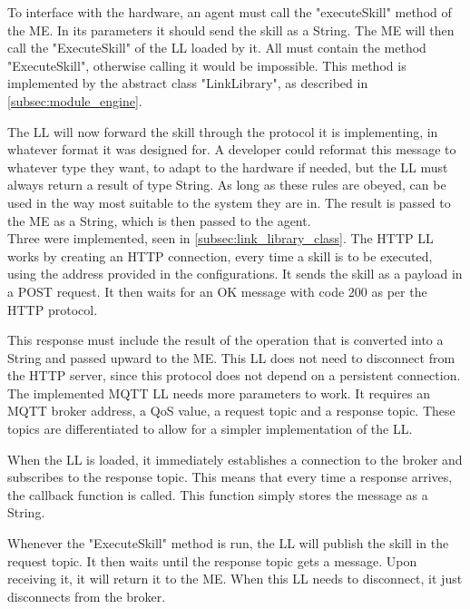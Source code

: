 To interface with the hardware, an agent must call the "executeSkill" method of the \acrlong{ME}. In its parameters it should send the skill as a String. The \acrshort{ME} will then call the "ExecuteSkill" of the \acrshort{LL} loaded by it. All  must contain the method "ExecuteSkill", otherwise calling it would be impossible. This method is implemented by the abstract class "LinkLibrary", as described in \ref{subsec:module_engine}.

The \acrshort{LL} will now forward the skill through the protocol it is implementing, in whatever format it was designed for. A developer could reformat this message to whatever type they want, to adapt to the hardware if needed, but the \acrshort{LL} must always return a result of type String. As long as these rules are obeyed,  can be used in the way most suitable to the system they are in. The result is passed to the \acrshort{ME} as a String, which is then passed to the agent.\\

Three  were implemented, seen in \ref{subsec:link_library_class}. The \acrshort{HTTP} \acrshort{LL} works by creating an \acrshort{HTTP} connection, every time a skill is to be executed, using the address provided in the configurations. It sends the skill as a payload in a POST request. It then waits for an OK message with code 200 as per the \acrshort{HTTP} protocol.

This response must include the result of the operation that is converted into a String and passed upward to the \acrshort{ME}. This \acrshort{LL} does not need to disconnect from the \acrshort{HTTP} server, since this protocol does not depend on a persistent connection.\\

The implemented \acrshort{MQTT} \acrshort{LL} needs more parameters to work. It requires an \acrshort{MQTT} broker address, a \acrfull{QoS} value, a request topic and a response topic. These topics are differentiated to allow for a simpler implementation of the \acrshort{LL}.

When the \acrshort{LL} is loaded, it immediately establishes a connection to the broker and subscribes to the response topic. This means that every time a response arrives, the callback function is called. This function simply stores the message as a String.

Whenever the "ExecuteSkill" method is run, the \acrshort{LL} will publish the skill in the request topic. It then waits until the response topic gets a message. Upon receiving it, it will return it to the \acrshort{ME}. When this \acrshort{LL} needs to disconnect, it just disconnects from the broker.\\

